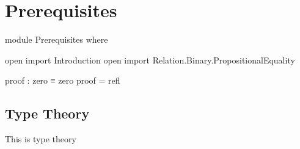 \chapter{Prerequisites}

\begin{code}[hide]
module Prerequisites where

open import Introduction
open import Relation.Binary.PropositionalEquality
\end{code}

\begin{code}
proof : zero ≡ zero
proof = refl
\end{code}

\section{Type Theory}

This is type theory
